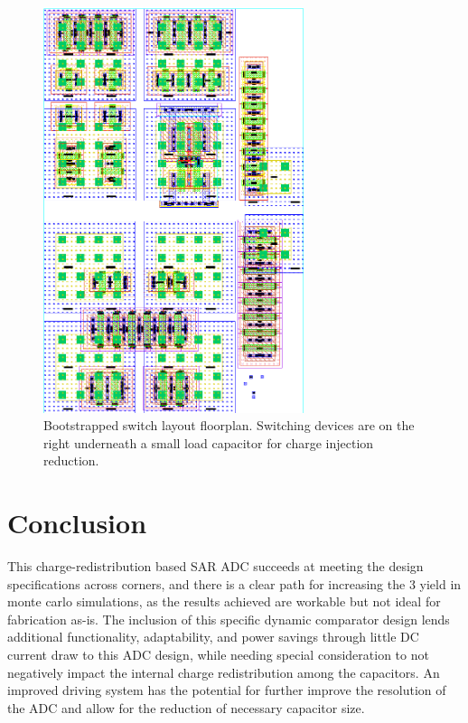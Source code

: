 \documentclass[11pt,letterpaper]{article}
\begin{document}
\begin{figure}[htbp!]
    \centering
    \includegraphics[width=3in]{images/bootsw_floorplan.eps}
    \caption{Bootstrapped switch layout floorplan. Switching devices are on the right underneath a small load capacitor for charge injection reduction.}\label{fig:bootsw_floorplan}
\end{figure}

\section{Conclusion}

This charge-redistribution based SAR ADC succeeds at meeting the design specifications across corners, and there is a clear path for increasing the \qty{3}{\sig} yield in monte carlo simulations, as the results achieved are workable but not ideal for fabrication as-is. The inclusion of this specific dynamic comparator design lends additional functionality, adaptability, and power savings through little DC current draw to this ADC design, while needing special consideration to not negatively impact the internal charge redistribution among the capacitors. An improved driving system has the potential for further improve the resolution of the ADC and allow for the reduction of necessary capacitor size.




\newpage
\end{document}
